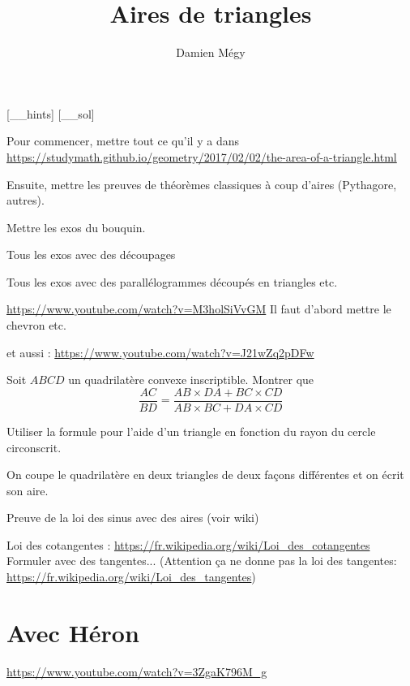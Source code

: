 




[_\jobname_hints]
[_\jobname_sol]


\title{Aires de triangles}
\author{Damien Mégy}
\maketitle

\avertissement 

Pour commencer, mettre tout ce qu'il y a dans \url{https://studymath.github.io/geometry/2017/02/02/the-area-of-a-triangle.html}

Ensuite, mettre les preuves de théorèmes classiques à coup d'aires (Pythagore, autres).

Mettre les exos du bouquin.

Tous les exos avec des découpages


Tous les exos avec des parallélogrammes découpés en triangles etc.


\begin{exo}
\url{https://www.youtube.com/watch?v=M3holSiVvGM}
Il faut d'abord mettre le chevron etc.
\begin{hint}
\end{hint}
\begin{sol}
\end{sol}
\end{exo}

et aussi : 
\url{https://www.youtube.com/watch?v=J21wZq2pDFw}


\begin{exo}
Soit $ABCD$ un quadrilatère convexe inscriptible.
Montrer que
\[ \frac{AC}{BD} = \frac{AB\times DA + BC\times CD}{AB\times BC + DA\times CD}\]
\begin{hint}
Utiliser la formule pour l'aide d'un triangle en fonction du rayon du cercle circonscrit.
\end{hint}
\begin{sol}
On coupe le quadrilatère en deux triangles de deux façons différentes et on écrit son aire.
\end{sol}
\end{exo}



Preuve de la loi des sinus avec des aires (voir wiki)


Loi des cotangentes : \url{https://fr.wikipedia.org/wiki/Loi_des_cotangentes} Formuler avec des tangentes...
(Attention ça ne donne pas la l\og oi des tangentes\fg : \url{https://fr.wikipedia.org/wiki/Loi_des_tangentes})



\section{Avec Héron}

\url{https://www.youtube.com/watch?v=3ZgaK796M_g}




\indications
\correction



